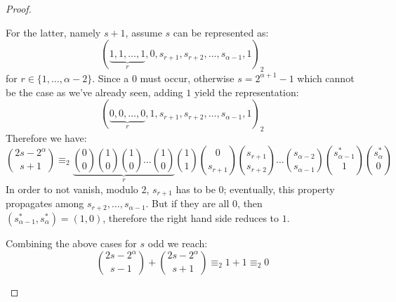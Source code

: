 \begin{proof}
\begin{itemize}
\begin{itemize}
                For the latter, namely $s+1$, assume $s$ can be represented as:
                \begin{displaymath}
                    (\underbrace{1,1,\ldots,1}_{r},0,s_{r+1},s_{r+2},\ldots,s_{{\alpha}-1},1)_{2}
                \end{displaymath}
                for $r\in\lbrace1,\ldots,{\alpha}-2\rbrace$. Since a $0$ must occur, otherwise $s=2^{{\alpha}+1}-1$
                which cannot be the case as we've already seen, adding $1$ yield the representation:
                \begin{displaymath}
                    (\underbrace{0,0,\ldots,0}_{r},1,s_{r+1},s_{r+2},\ldots,s_{{\alpha}-1},1)_{2}
                \end{displaymath}
                Therefore we have:
                \begin{displaymath}
                    {{2s-2^{{\alpha}}}\choose{s+1}} 
                    \equiv_{2} 
                    \underbrace{
                        {{0}\choose{0}} 
                        {{1}\choose{0}}
                        {{1}\choose{0}}
                        \ldots
                        {{1}\choose{0}}
                    }_{r}
                    {{1}\choose{1}}
                    {{0}\choose{s_{r+1}}}
                    {{s_{r+1}}\choose{s_{r+2}}}
                    \ldots
                    {{s_{{\alpha}-2}}\choose{s_{{\alpha}-1}}}
                    {{s_{{\alpha}-1}^{*}}\choose{1}}
                    {{s_{{\alpha}}^{*}}\choose{0}}
                \end{displaymath}
                In order to not vanish, modulo $2$, 
                $s_{r+1}$ has to be $0$; eventually, this property propagates among $s_{r+2}, \ldots, s_{{\alpha}-1}$. 
                But if they are all $0$, %
                then $(s_{{\alpha}-1}^{*},s_{{\alpha}}^{*})=(1,0)$, therefore the right hand side reduces to $1$.

                Combining the above cases for $s$ odd we reach:
                \begin{displaymath}
                        {{2s-2^{{\alpha}}}\choose{s-1}}+{{2s-2^{{\alpha}}}\choose{s+1}} \equiv_{2} 1+1\equiv_{2} 0
                \end{displaymath}
        \end{itemize}


\end{itemize}
\end{proof}
